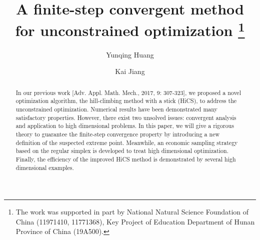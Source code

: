 \DeclareMathOperator*{\argmin}{\mathrm{argmin}}
\DeclareMathOperator*{\argmax}{\mathrm{argmax}}

%

	
	\title{A finite-step convergent method for unconstrained optimization
		\thanks{The work was supported in part by National Natural Science Foundation
		of China (11971410, 11771368), Key Project of Education
Department of Hunan Province of China (19A500).}}
	
	
	
	\author{Yunqing Huang \and  Kai Jiang%
	}
	
	
	
	


\maketitle
\begin{abstract}
In our previous work [Adv. Appl. Math. Mech., 2017, 9: 307-323],
we proposed a novel optimization algorithm, the hill-climbing
method with a stick (HiCS), to address the unconstrained optimization. Numerical
results have been demonstrated many satisfactory properties.
However, there exist two unsolved issues: convergent
analysis and application to high dimensional problems. 
In this paper, we will give a rigorous theory to guarantee the finite-step
convergence property by introducing a new definition of the suspected
extreme point. Meanwhile, an economic sampling
strategy based on the regular simplex is
developed to treat high dimensional optimization. Finally, 
the efficiency of the improved HiCS method is demonstrated by several
high dimensional examples.

\end{abstract}

